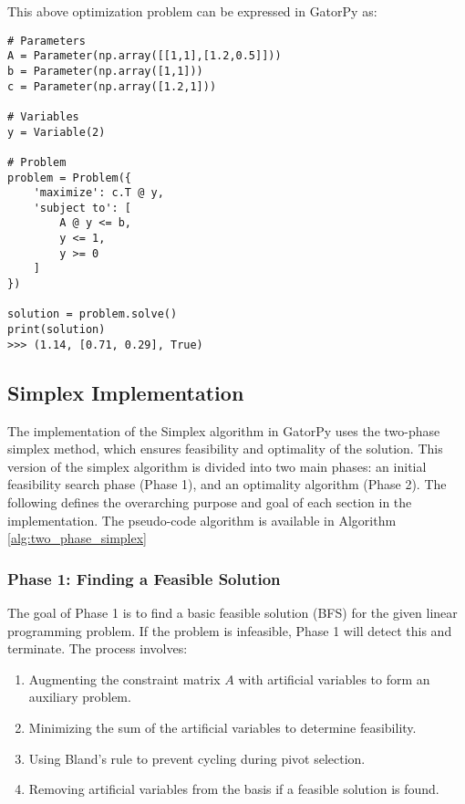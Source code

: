 \documentclass[conference]{IEEEtran}
\begin{document}
This above optimization problem can be expressed in GatorPy as:
\begin{lstlisting}[style=mypython, caption={Solving a Linear Program Symbolically}]
# Parameters
A = Parameter(np.array([[1,1],[1.2,0.5]]))
b = Parameter(np.array([1,1]))
c = Parameter(np.array([1.2,1]))

# Variables
y = Variable(2)

# Problem
problem = Problem({
    'maximize': c.T @ y,
    'subject to': [
        A @ y <= b,
        y <= 1,
        y >= 0
    ]
})

solution = problem.solve()
print(solution)
>>> (1.14, [0.71, 0.29], True)
\end{lstlisting}

\subsection{Simplex Implementation}
\label{Simplex}
The implementation of the Simplex algorithm in GatorPy uses  the two-phase simplex method, which ensures feasibility and optimality of the solution. 
This version of the simplex algorithm is divided into two main phases: an initial feasibility search phase (Phase 1), and an optimality algorithm (Phase 2). 
The following defines the overarching purpose and goal of each section in the implementation.
The pseudo-code algorithm is available in Algorithm \ref{alg:two_phase_simplex}


\subsubsection{Phase 1: Finding a Feasible Solution}
The goal of Phase 1 is to find a basic feasible solution (BFS) for the given linear programming problem. If the problem is infeasible, Phase 1 will detect this and terminate. The process involves:
\begin{enumerate}
    \item Augmenting the constraint matrix \( A \) with artificial variables to form an auxiliary problem.
    \item Minimizing the sum of the artificial variables to determine feasibility.
    \item Using Bland's rule to prevent cycling during pivot selection.
    \item Removing artificial variables from the basis if a feasible solution is found.
\end{enumerate}
\end{document}
